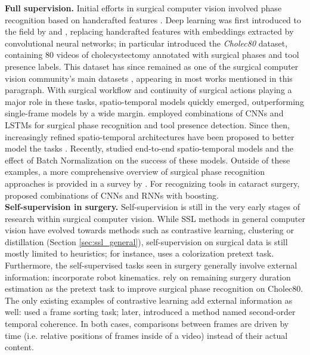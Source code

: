 \documentclass[times,twocolumn,final]{elsarticle}
\begin{document}
\noindent\textbf{Full supervision.}
Initial efforts in surgical computer vision involved phase recognition based on handcrafted features \citep{padoy_phase, blum_phase}. Deep learning was first introduced to the field by \cite{twinanda2016endonet} and \cite{dergachyova_phase}, replacing handcrafted features with embeddings extracted by convolutional neural networks; \cite{twinanda2016endonet} in particular introduced the \textit{Cholec80} dataset, containing 80 videos of cholecystectomy annotated with surgical phases and tool presence labels. This dataset has since remained as one of the {\color{newtext}surgical} computer vision community's main datasets \citep{sds}, appearing in most works mentioned in this paragraph.
With surgical workflow and continuity of surgical actions playing a major role in these tasks, spatio-temporal models quickly emerged, outperforming single-frame models by a wide margin. \cite{endolstm} employed combinations of CNNs and LSTMs for surgical phase recognition and tool presence detection. Since then, increasingly refined spatio-temporal architectures have been proposed to better model the tasks \textcolor{changetext}{\citep{svrcnet, mtrcnet, Czempiel2020TeCNOSP, TMRNet, opera}}. \textcolor{newtext}{Recently, \cite{BNpitfalls} studied end-to-end spatio-temporal models and the effect of Batch Normalization on the success of these models}. Outside of these examples, a more comprehensive overview of surgical phase recognition approaches is provided in a survey by \cite{phase_review}. For recognizing tools in cataract surgery, \cite{al2018monitoring} proposed combinations of CNNs and RNNs with boosting.
\\
\noindent\textbf{Self-supervision in surgery. }
Self-supervision is still in the very early stages of research within surgical computer vision. While SSL methods in general computer vision have evolved towards methods such as contrastive learning, clustering or distillation (Section \ref{sec:ssl_general}), self-supervision on surgical data is still mostly limited to heuristics; for instance, \cite{ross2018exploiting} uses a colorization pretext task. Furthermore, the self-supervised tasks seen in surgery generally involve external information: \cite{da2019self, sestini2021kinematic} incorporate robot kinematics. \cite{yengera2018less} rely on remaining surgery duration estimation as the pretext task to improve surgical phase recognition on Cholec80. The only existing examples of contrastive learning add external information as well: \cite{bodenstedt_framesort} used a frame sorting task; later, \cite{funke2018temporal} introduced a method named second-order temporal coherence. In both cases, comparisons between frames are driven by time (i.e. relative positions of frames inside of a video) instead of their actual content.
\end{document}
